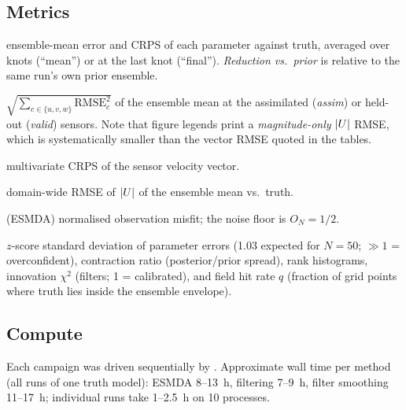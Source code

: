 \subsection{Metrics}
\begin{description}[nosep]
  \item[Parameter RMSE / CRPS] ensemble-mean error and CRPS of each parameter against truth,
        averaged over knots (``mean'') or at the last knot (``final''). \emph{Reduction vs.\
        prior} is relative to the same run's own prior ensemble.
  \item[Sensor vector RMSE] $\sqrt{\sum_{c\in\{u,v,w\}}\mathrm{RMSE}_c^2}$ of the ensemble
        mean at the assimilated (\emph{assim}) or held-out (\emph{valid}) sensors. Note that
        figure legends print a \emph{magnitude-only} $|U|$ RMSE, which is systematically
        smaller than the vector RMSE quoted in the tables.
  \item[Energy score (ES)] multivariate CRPS of the sensor velocity vector.
  \item[State RMSE] domain-wide RMSE of $|U|$ of the ensemble mean vs.\ truth.
  \item[Data mismatch $O_N$] (ESMDA) normalised observation misfit; the noise floor is
        $O_N=1/2$.
  \item[Calibration] $z$-score standard deviation of parameter errors (1.03 expected for
        $N=50$; $\gg 1$ = overconfident), contraction ratio (posterior/prior spread),
        rank histograms, innovation $\chi^2$ (filters; 1 = calibrated), and field hit rate
        $q$ (fraction of grid points where truth lies inside the ensemble envelope).
\end{description}

\subsection{Compute}
Each campaign was driven sequentially by . Approximate
wall time per method (all runs of one truth model): ESMDA 8--13~h, filtering 7--9~h,
filter smoothing 11--17~h; individual runs take 1--2.5~h on 10 processes.
